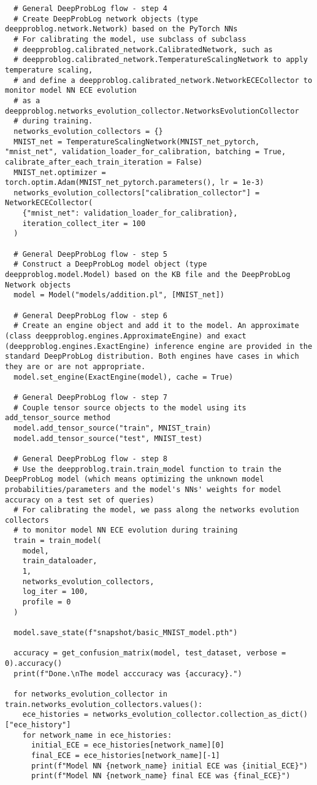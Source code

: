 \begin{lstlisting}
  # General DeepProbLog flow - step 4
  # Create DeepProbLog network objects (type deepproblog.network.Network) based on the PyTorch NNs
  # For calibrating the model, use subclass of subclass
  # deepproblog.calibrated_network.CalibratedNetwork, such as
  # deepproblog.calibrated_network.TemperatureScalingNetwork to apply temperature scaling,
  # and define a deepproblog.calibrated_network.NetworkECECollector to monitor model NN ECE evolution
  # as a deepproblog.networks_evolution_collector.NetworksEvolutionCollector
  # during training.
  networks_evolution_collectors = {}
  MNIST_net = TemperatureScalingNetwork(MNIST_net_pytorch, "mnist_net", validation_loader_for_calibration, batching = True, calibrate_after_each_train_iteration = False)
  MNIST_net.optimizer = torch.optim.Adam(MNIST_net_pytorch.parameters(), lr = 1e-3)
  networks_evolution_collectors["calibration_collector"] = NetworkECECollector(
    {"mnist_net": validation_loader_for_calibration},
    iteration_collect_iter = 100
  )

  # General DeepProbLog flow - step 5
  # Construct a DeepProbLog model object (type deepproblog.model.Model) based on the KB file and the DeepProbLog Network objects
  model = Model("models/addition.pl", [MNIST_net])

  # General DeepProbLog flow - step 6
  # Create an engine object and add it to the model. An approximate (class deepproblog.engines.ApproximateEngine) and exact (deepproblog.engines.ExactEngine) inference engine are provided in the standard DeepProbLog distribution. Both engines have cases in which they are or are not appropriate.
  model.set_engine(ExactEngine(model), cache = True)

  # General DeepProbLog flow - step 7
  # Couple tensor source objects to the model using its add_tensor_source method
  model.add_tensor_source("train", MNIST_train)
  model.add_tensor_source("test", MNIST_test)

  # General DeepProbLog flow - step 8
  # Use the deepproblog.train.train_model function to train the DeepProbLog model (which means optimizing the unknown model probabilities/parameters and the model's NNs' weights for model accuracy on a test set of queries)
  # For calibrating the model, we pass along the networks evolution collectors
  # to monitor model NN ECE evolution during training
  train = train_model(
    model,
    train_dataloader,
    1,
    networks_evolution_collectors,
    log_iter = 100,
    profile = 0
  )

  model.save_state(f"snapshot/basic_MNIST_model.pth")

  accuracy = get_confusion_matrix(model, test_dataset, verbose = 0).accuracy()
  print(f"Done.\nThe model acccuracy was {accuracy}.")

  for networks_evolution_collector in train.networks_evolution_collectors.values():
    ece_histories = networks_evolution_collector.collection_as_dict()["ece_history"]
    for network_name in ece_histories:
      initial_ECE = ece_histories[network_name][0]
      final_ECE = ece_histories[network_name][-1]
      print(f"Model NN {network_name} initial ECE was {initial_ECE}")
      print(f"Model NN {network_name} final ECE was {final_ECE}")
\end{lstlisting}

